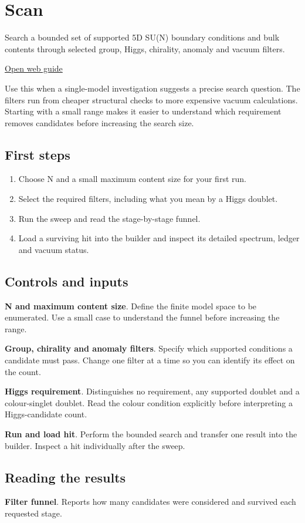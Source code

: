 \documentclass[11pt,a4paper]{article}
\begin{document}
\section{Scan}
Search a bounded set of supported 5D SU(N) boundary conditions and bulk contents through selected group, Higgs, chirality, anomaly and vacuum filters.

\href{https://karlesmarin.github.io/ghu-explorer/guide/sweep5d/index.html}{Open web guide}

Use this when a single-model investigation suggests a precise search question. The filters run from cheaper structural checks to more expensive vacuum calculations. Starting with a small range makes it easier to understand which requirement removes candidates before increasing the search size.
\subsection*{First steps}
\begin{enumerate}
\item Choose N and a small maximum content size for your first run.
\item Select the required filters, including what you mean by a Higgs doublet.
\item Run the sweep and read the stage-by-stage funnel.
\item Load a surviving hit into the builder and inspect its detailed spectrum, ledger and vacuum status.
\end{enumerate}
\subsection*{Controls and inputs}
\textbf{N and maximum content size}. Define the finite model space to be enumerated. Use a small case to understand the funnel before increasing the range.

\textbf{Group, chirality and anomaly filters}. Specify which supported conditions a candidate must pass. Change one filter at a time so you can identify its effect on the count.

\textbf{Higgs requirement}. Distinguishes no requirement, any supported doublet and a colour-singlet doublet. Read the colour condition explicitly before interpreting a Higgs-candidate count.

\textbf{Run and load hit}. Perform the bounded search and transfer one result into the builder. Inspect a hit individually after the sweep.

\subsection*{Reading the results}
\textbf{Filter funnel}. Reports how many candidates were considered and survived each requested stage.
\end{document}
